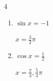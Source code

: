 \begin{multicols}{4}
\begin{enumerate}
        $\displaystyle x = \frac{5}{6}\pi , \frac{11}{6}\pi$

  \item $\displaystyle \sin{x}  = -1$

        $\displaystyle x = \frac{3}{2}\pi$

  \item $\displaystyle \cos{x}  = \frac{1}{2}$

        $\displaystyle x = \frac{\pi}{3} , \frac{5}{3}\pi$

\end{enumerate}
\end{multicols}
